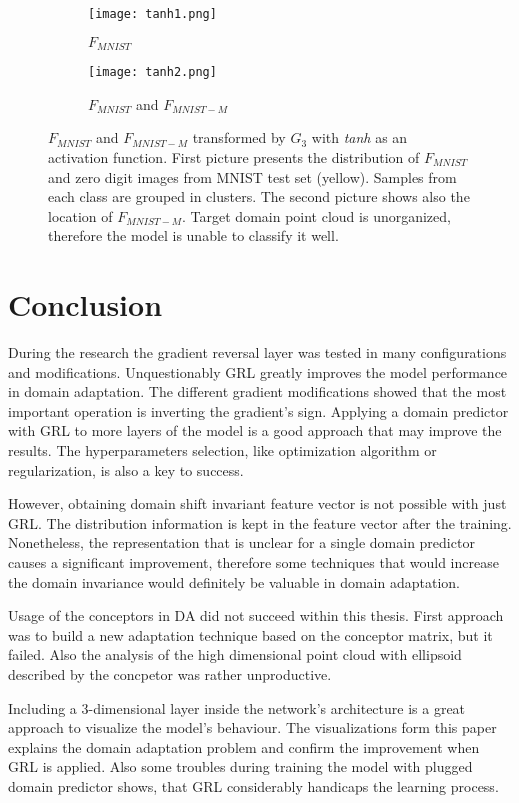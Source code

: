\documentclass{article}
\begin{document}
\begin{figure}[H]%
    \centering
    \begin{subfigure}[b]{0.48\textwidth}
        \texttt{[image: tanh1.png]}
        \caption{$F_{MNIST}$}
    \end{subfigure}%
    \begin{subfigure}[b]{0.48\textwidth}
        \texttt{[image: tanh2.png]}
        \caption{$F_{MNIST}$ and $F_{MNIST-M}$}
    \end{subfigure}%
    \caption{$F_{MNIST}$ and $F_{MNIST-M}$ transformed by $G_{3}$ with \textit{tanh} as an activation function. First picture presents the distribution of $F_{MNIST}$ and zero digit images from MNIST test set (yellow). Samples from each class are grouped in clusters. The second picture shows also the location of $F_{MNIST-M}$. Target domain point cloud is unorganized, therefore the model is unable to classify it well.}%
    \label{fig:tanh}%
\end{figure}

\section{Conclusion}
During the research the gradient reversal layer was tested in many configurations and modifications. Unquestionably GRL greatly improves the model performance in domain adaptation. The different gradient modifications showed that the most important operation is inverting the gradient's sign. Applying a domain predictor with GRL to more layers of the model is a good approach that may improve the results. The hyperparameters selection, like optimization algorithm or regularization, is also a key to success.
\par
However, obtaining domain shift invariant feature vector is not possible with just GRL. The distribution information is kept in the feature vector after the training. Nonetheless, the representation that is unclear for a single domain predictor causes a significant improvement, therefore some techniques that would increase the domain invariance would definitely be valuable in domain adaptation.
\par
Usage of the conceptors in DA did not succeed within this thesis. First approach was to build a new adaptation technique based on the conceptor matrix, but it failed. Also the analysis of the high dimensional point cloud with ellipsoid described by the concpetor was rather unproductive.
\par
Including a 3-dimensional layer inside the network's architecture is a great approach to visualize the model's behaviour. The visualizations form this paper explains the domain adaptation problem and confirm the improvement when GRL is applied. Also some troubles during training the model with plugged domain predictor shows, that GRL considerably handicaps the learning process.

\printbibliography
\end{document}
